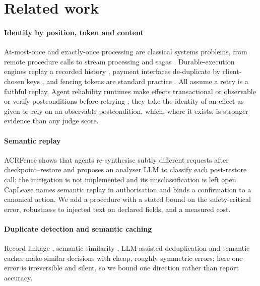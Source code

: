 \section{Related work}\label{sec:related}

\paragraph{Identity by position, token and content}
At-most-once and exactly-once processing are classical systems problems, from remote procedure calls \citep{birrell1984rpc} to stream processing \citep{carbone2017flink} and sagas \citep{garcia1987sagas}. Durable-execution engines replay a recorded history \citep{temporal2026docs,restate2026docs,resume2026contract}, payment interfaces de-duplicate by client-chosen keys \citep{stripe2026idempotency}, and fencing tokens are standard practice \citep{kleppmann2017ddia}. All assume a retry is a faithful replay. Agent reliability runtimes make effects transactional or observable \citep{atomix2026,lyu2026coagent,balakrishnan2026logact,mozafari2026transaction} or verify postconditions before retrying \citep{mansoor2026verified}; they take the identity of an effect as given or rely on an observable postcondition, which, where it exists, is stronger evidence than any judge score.

\paragraph{Semantic replay}
ACRFence \citep{zheng2026acrfence} shows that agents re-synthesise subtly different requests after checkpoint--restore and proposes an analyser LLM to classify each post-restore call; the mitigation is not implemented and its misclassification is left open. CapLease \citep{xu2026caplease} names semantic replay in authorisation and binds a confirmation to a canonical action. We add a procedure with a stated bound on the safety-critical error, robustness to injected text on declared fields, and a measured cost.

\paragraph{Duplicate detection and semantic caching}
Record linkage \citep{elmagarmid2007duplicate}, semantic similarity \citep{cer2017sts}, LLM-assisted deduplication \citep{fang2026semhash} and semantic caches \citep{gill2025meancache} make similar decisions with cheap, roughly symmetric errors; here one error is irreversible and silent, so we bound one direction rather than report accuracy.

